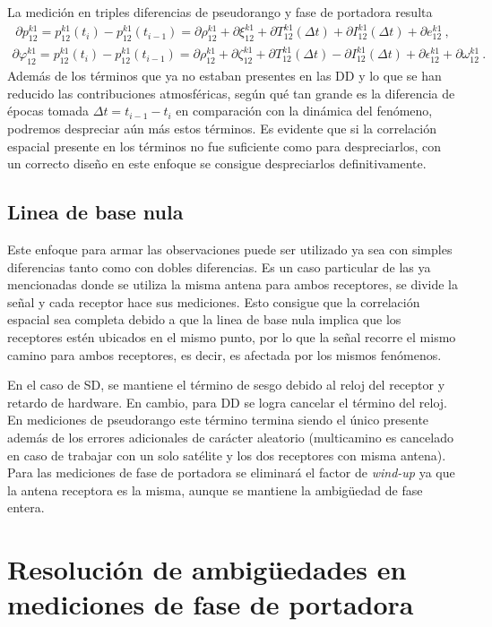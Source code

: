 \documentclass[a4paper,12pt,oneside,onecolumn,final,openright]{book}%
\begin{document}
	La medición en triples diferencias de pseudorango y fase de portadora resulta
\begin{align}
	\partial p_{12}^{k1} = p_{12}^{k1}(t_i) - p_{12}^{k1}(t_{i-1}) = \partial\rho_{12}^{k1} + \partial\xi_{12}^{k1} + \partial T_{12}^{k1}(\Delta t) + \partial I_{12}^{k1}(\Delta t) + \partial e_{12}^{k1} \ ,
\end{align}
\begin{align}
	\partial \varphi_{12}^{k1} = p_{12}^{k1}(t_i) - p_{12}^{k1}(t_{i-1}) = \partial\rho_{12}^{k1} + \partial\zeta_{12}^{k1} + \partial T_{12}^{k1}(\Delta t) - \partial I_{12}^{k1}(\Delta t) + \partial \epsilon_{12}^{k1} + \partial\omega_{12}^{k1}\ .
\end{align}
	Además de los términos que ya no estaban presentes en las DD y lo que se han reducido las contribuciones atmosféricas, según qué tan grande es la diferencia de épocas tomada $\Delta t = t_{i-1}-t_i$ en comparación con la dinámica del fenómeno, podremos despreciar aún más estos términos. Es evidente que si la correlación espacial presente en los términos no fue suficiente como para despreciarlos, con un correcto diseño en este enfoque se consigue despreciarlos definitivamente.
\subsection{Linea de base nula}
	Este enfoque para armar las observaciones puede ser utilizado ya sea con simples diferencias tanto como con dobles diferencias. Es un caso particular de las ya mencionadas donde se utiliza la misma antena para ambos receptores, se divide la señal y cada receptor hace sus mediciones. Esto consigue que la correlación espacial sea completa debido a que la linea de base nula implica que los receptores estén ubicados en el mismo punto, por lo que la señal recorre el mismo camino para ambos receptores, es decir, es afectada por los mismos fenómenos. 
	
	En el caso de SD, se mantiene el término de sesgo debido al reloj del receptor y retardo de hardware. En cambio, para DD se logra cancelar el término del reloj. En mediciones de pseudorango este término termina siendo el único presente además de los errores adicionales de carácter aleatorio (multicamino es cancelado en caso de trabajar con un solo satélite y los dos receptores con misma antena). Para las mediciones de fase de portadora se eliminará el factor de \textit{wind-up} ya que la antena receptora es la misma, aunque se mantiene la ambigüedad de fase entera.
\section{Resolución de ambigüedades en mediciones de fase de portadora}
\end{document}
